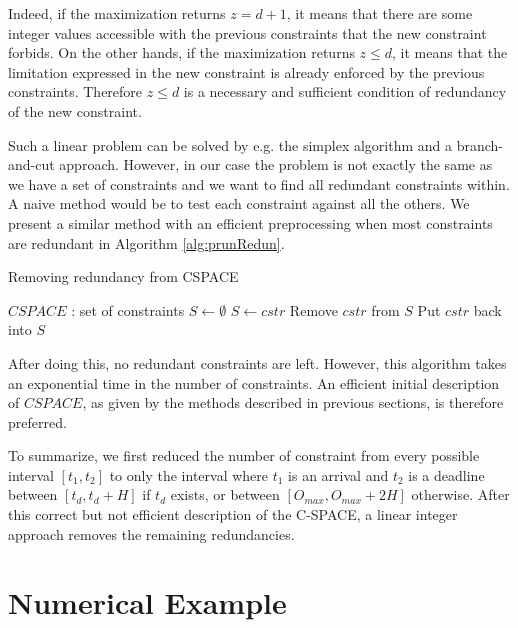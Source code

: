 \documentclass[conference]{IEEEtran}
\begin{document}
Indeed, if the maximization returns $z=d+1$, it means that there are some integer values accessible with the previous constraints that the new constraint forbids. On the other hands, if the maximization returns $z \leq d$, it means that the limitation expressed in the new constraint is already enforced by the previous constraints. Therefore $z \leq d$ is a necessary and sufficient condition of redundancy of the new constraint.

Such a linear problem can be solved by e.g. the simplex algorithm and a branch-and-cut approach. However, in our case the problem is not exactly the same as we have a set of constraints and we want to find all redundant constraints within. A naive method would be to test each constraint against all the others. We present a similar method with an efficient preprocessing when most constraints are redundant in Algorithm \ref{alg:prunRedun}.

\begin{algorithm}
\caption{Removing redundancy from CSPACE}
\label{alg:prunRedun}
  \begin{algorithmic}[1]
    \STATE $CSPACE$ : set of constraints
    \STATE $S \leftarrow \emptyset$
    \STATE {}
        \STATE $S \leftarrow cstr$
      \ENDIF
    \ENDFOR
    \STATE {}
      \STATE Remove $cstr$ from $S$
        \STATE Put $cstr$ back into $S$
      \ENDIF
    \ENDFOR
  \end{algorithmic}
\end{algorithm}

After doing this, no redundant constraints are left. However, this algorithm takes an exponential time in the number of constraints. An efficient initial description of $CSPACE$, as given by the methods described in previous sections, is therefore preferred.

To summarize, we first reduced the number of constraint from every possible interval $[t_1, t_2]$ to only the interval where $t_1$ is an arrival and $t_2$ is a deadline between $[t_d, t_d + H]$ if $t_d$ exists, or between $[O_{max}, O_{max} + 2H]$ otherwise. After this correct but not efficient description of the C-SPACE, a linear integer approach removes the remaining redundancies.

\section{Numerical Example}
\end{document}
